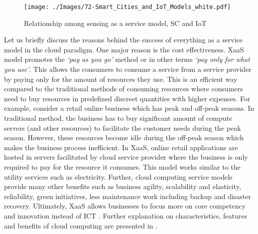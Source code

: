 \documentclass[times]{ettauth}
\begin{document}
\begin{figure*}[t]
 \centering
 \texttt{[image: ./Images/72-Smart\_Cities\_and\_IoT\_Models\_white.pdf]}
\caption{Relationship among sensing as a service model, SC and IoT}
 \label{Figure:Smart_Cities_and_IoT_Models}	
\vspace{-0.20cm}	
\end{figure*}


Let us briefly discuss the reasons behind the success of everything as a service model in the cloud paradigm. One major reason is the cost effectiveness. XaaS model promotes the \textit{`pay as you go'} method or in other terms \textit{`pay only for what you use'}.  This allows the consumers to consume a service from a service provider by paying only for the amount of resources they use. This is an efficient way compared to the traditional methods of consuming resources where consumers need to buy resources in predefined discreet quantities with higher expenses. For example, consider a retail online business which has peak and off-peak seasons. In traditional method, the business has to buy significant amount of compute servers (and other resources) to facilitate the customer needs during the peak season. However, these resources become idle during the off-peak season which makes the business process inefficient. In XaaS, online retail applications are hosted in servers facilitated by cloud service provider where the business is only required to pay for the resource it consumes. This model works similar to the utility services such as electricity. Further, cloud computing service models provide many other benefits such as business agility, scalability and elasticity, reliability, green initiatives, less maintenance work including backup and disaster recovery. Ultimately, XaaS allows businesses to focus more on core competency and innovation instead of ICT \cite{P539}. Further explanation on characteristics, features and benefits of cloud computing are presented in \cite{P498,P501}.
\end{document}
